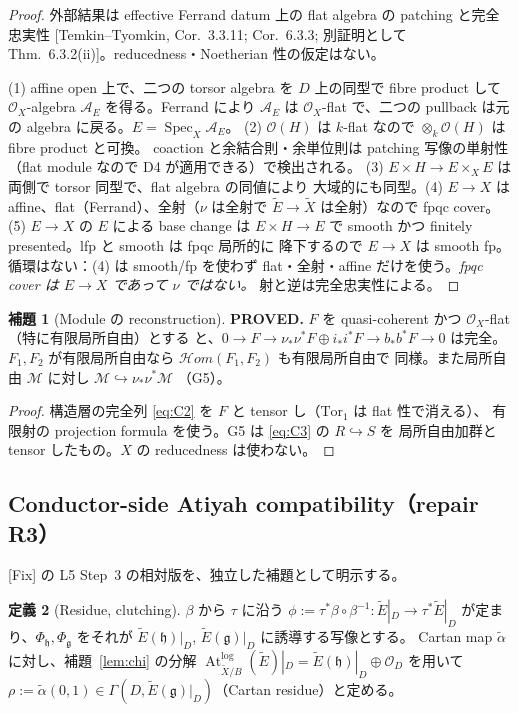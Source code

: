 \documentclass[11pt,a4paper]{article}
\numberwithin{equation}{section}
\theoremstyle{definition}
\newtheorem{definition}{定義}[section]
\newtheorem{lemma}[definition]{補題}
\newcommand{\OO}{\mathcal O}
\newcommand{\g}{\mathfrak g}
\newcommand{\h}{\mathfrak h}
\newcommand{\Atlog}{\operatorname{At}^{\log}}
\newcommand{\tX}{\widetilde X}
\newcommand{\tE}{\widetilde E}
\newcommand{\tal}{\widetilde\alpha}
\begin{document}
\begin{proof}
外部結果は effective Ferrand datum 上の flat algebra の patching と完全忠実性
[Temkin--Tyomkin, Cor.~3.3.11; Cor.~6.3.3; 別証明として
Thm.~6.3.2(ii)]。reducedness・Noetherian 性の仮定はない。

(1) affine open 上で、二つの torsor algebra を $D$ 上の同型で fibre product して
$\OO_X$-algebra $\mathcal A_E$ を得る。Ferrand により $\mathcal A_E$ は $\OO_X$-flat
で、二つの pullback は元の algebra に戻る。$E=\operatorname{Spec}_X\mathcal A_E$。
(2) $\OO(H)$ は $k$-flat なので $\otimes_k\OO(H)$ は fibre product と可換。
coaction と余結合則・余単位則は patching 写像の単射性
（flat module なので D4 が適用できる）で検出される。
(3) $E\times H\to E\times_XE$ は両側で torsor 同型で、flat algebra の同値により
大域的にも同型。(4) $E\to X$ は affine、flat（Ferrand）、全射（$\nu$ は全射で
$\tE\to\tX$ は全射）なので fpqc cover。(5) $E\to X$ の $E$ による base change は
$E\times H\to E$ で smooth かつ finitely presented。lfp と smooth は fpqc 局所的に
降下するので $E\to X$ は smooth fp。循環はない：(4) は smooth/fp を使わず
flat・全射・affine だけを使う。\emph{fpqc cover は $E\to X$ であって
$\nu$ ではない。}
射と逆は完全忠実性による。
\end{proof}

\begin{lemma}[Module の reconstruction]\label{lem:D4}
\textbf{PROVED.} $F$ を quasi-coherent かつ $\OO_X$-flat（特に有限局所自由）とする
と、$0\to F\to\nu_*\nu^*F\oplus i_*i^*F\to b_*b^*F\to0$ は完全。
$F_1,F_2$ が有限局所自由なら $\mathcal Hom(F_1,F_2)$ も有限局所自由で
同様。また局所自由 $\mathcal M$ に対し $\mathcal M\hookrightarrow\nu_*\nu^*\mathcal M$
（G5）。
\end{lemma}

\begin{proof}
構造層の完全列 \eqref{eq:C2} を $F$ と tensor し（$\mathrm{Tor}_1$ は flat 性で消える）、
有限射の projection formula を使う。G5 は \eqref{eq:C3} の $R\hookrightarrow S$ を
局所自由加群と tensor したもの。$X$ の reducedness は使わない。
\end{proof}

\subsection{Conductor-side Atiyah compatibility（repair R3）}

[Fix] の L5 Step~3 の相対版を、独立した補題として明示する。

\begin{definition}[Residue, clutching]\label{def:residue}
$\beta$ から $\tau$ に沿う $\phi:=\tau^*\beta\circ\beta^{-1}:\tE|_D\to\tau^*\tE|_D$
が定まり、$\Phi_\h,\Phi_\g$ をそれが $\tE(\h)|_D$, $\tE(\g)|_D$ に誘導する写像とする。
Cartan map $\tal$ に対し、補題~\ref{lem:chi} の分解
$\Atlog_{\tX/B}(\tE)|_D=\tE(\h)|_D\oplus\OO_D$ を用いて
$\rho:=\tal(0,1)\in\Gamma(D,\tE(\g)|_D)$（Cartan residue）と定める。
\end{definition}
\end{document}

